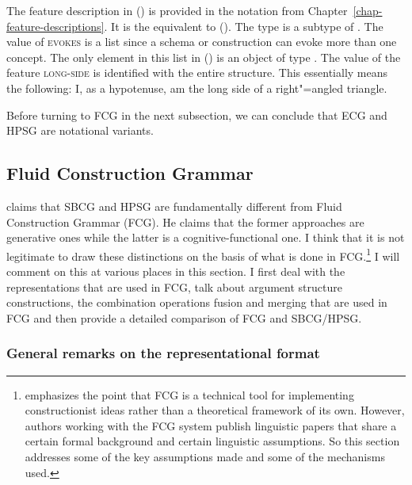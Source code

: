 The feature description in () is provided in the notation from
Chapter~\ref{chap-feature-descriptions}. It is the equivalent to
().
\ea
{} 
\z
The type  is a subtype of .
The value of \textsc{evokes} is a list since a schema or construction can evoke more than one concept. The only element in this list in ()
is an object of type . The value of the feature \textsc{long-side} is identified with the entire structure. This essentially
means the following: I, as a hypotenuse, am the long side of a right"=angled triangle.

Before turning to FCG in the next subsection, we can conclude that ECG and HPSG are notational variants.



\subsection{Fluid Construction Grammar}
\label{sec-fcg}

 claims that SBCG and HPSG are fundamentally
different from Fluid Construction Grammar (FCG). He claims that the former approaches are generative ones while the latter is a
cognitive-functional one. I think that it is not legitimate to draw these distinctions on the basis
of what is done in FCG.\footnote{\label{Steels-FCG-System}
  \citet[]{Steels2013a} emphasizes the point that FCG is a technical tool for implementing constructionist ideas rather than
  a theoretical framework of its own. However, authors working with the FCG system publish linguistic papers
  that share a certain formal background and certain linguistic assumptions. So this section
  addresses some of the key assumptions made and some of the mechanisms used.
} I will comment on this at various places in this section. I first deal with
the representations that are used in FCG, talk about argument structure constructions, the
combination operations fusion and merging that are used in FCG and then provide a detailed comparison of FCG and
SBCG/HPSG.


\subsubsection{General remarks on the representational format}

